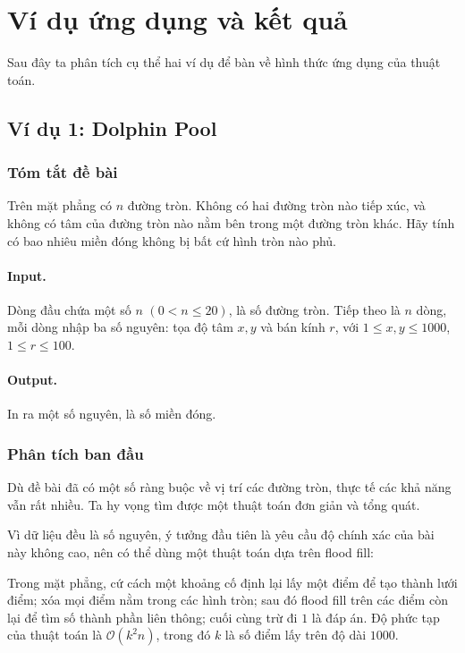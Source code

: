 \documentclass[11pt]{article}
\newcommand{\Oh}{\mathcal{O}}
\begin{document}
\section{Ví dụ ứng dụng và kết quả}

Sau đây ta phân tích cụ thể hai ví dụ để bàn về hình thức ứng dụng của thuật
toán.

\subsection{Ví dụ 1: Dolphin Pool}

\subsubsection*{Tóm tắt đề bài}

Trên mặt phẳng có \(n\) đường tròn. Không có hai đường tròn nào tiếp xúc, và
không có tâm của đường tròn nào nằm bên trong một đường tròn khác. Hãy tính có
bao nhiêu miền đóng không bị bất cứ hình tròn nào phủ.

\paragraph{Input.}
Dòng đầu chứa một số \(n\) \((0<n\le 20)\), là số đường tròn. Tiếp theo là
\(n\) dòng, mỗi dòng nhập ba số nguyên: tọa độ tâm \(x,y\) và bán kính \(r\),
với \(1\le x,y\le 1000\), \(1\le r\le 100\).

\paragraph{Output.}
In ra một số nguyên, là số miền đóng.

\subsubsection*{Phân tích ban đầu}

Dù đề bài đã có một số ràng buộc về vị trí các đường tròn, thực tế các khả
năng vẫn rất nhiều. Ta hy vọng tìm được một thuật toán đơn giản và tổng quát.

Vì dữ liệu đều là số nguyên, ý tưởng đầu tiên là yêu cầu độ chính xác của bài
này không cao, nên có thể dùng một thuật toán dựa trên flood fill:

Trong mặt phẳng, cứ cách một khoảng cố định lại lấy một điểm để tạo thành lưới
điểm; xóa mọi điểm nằm trong các hình tròn; sau đó flood fill trên các điểm còn
lại để tìm số thành phần liên thông; cuối cùng trừ đi \(1\) là đáp án. Độ phức
tạp của thuật toán là \(\Oh(k^2n)\), trong đó \(k\) là số điểm lấy trên độ dài
\(1000\).
\end{document}
